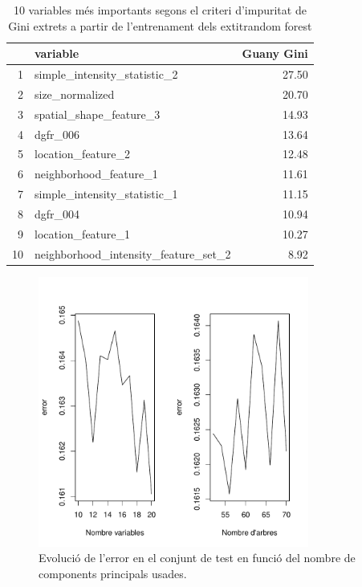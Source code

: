 \documentclass[a4paper,10pt]{article}
\begin{document}
\begin{table}[ht]
\begin{center}
\begin{tabular}{rlr}
  \hline
 & variable & Guany Gini \\ 
  \hline
1 & simple\_intensity\_statistic\_2 & 27.50 \\ 
  2 & size\_normalized & 20.70 \\ 
  3 & spatial\_shape\_feature\_3 & 14.93 \\ 
  4 & dgfr\_006 & 13.64 \\ 
  5 & location\_feature\_2 & 12.48 \\ 
  6 & neighborhood\_feature\_1 & 11.61 \\ 
  7 & simple\_intensity\_statistic\_1 & 11.15 \\ 
  8 & dgfr\_004 & 10.94 \\ 
  9 & location\_feature\_1 & 10.27 \\ 
  10 & neighborhood\_intensity\_feature\_set\_2 & 8.92 \\ 
   \hline
\end{tabular}
\caption{10 variables més importants segons el criteri d'impuritat de Gini extrets a partir de l'entrenament dels 	extit{random forest}}
\label{tab:topvar_gini}
\end{center}
\end{table}
\begin{figure}
\centering
\includegraphics[width=3.5in]{memoria-rf_tuning}
\caption{Evolució de l'error en el conjunt de test en funció del nombre de components principals usades.} \label{fig:rf_tuning}
\end{figure}
\end{document}
